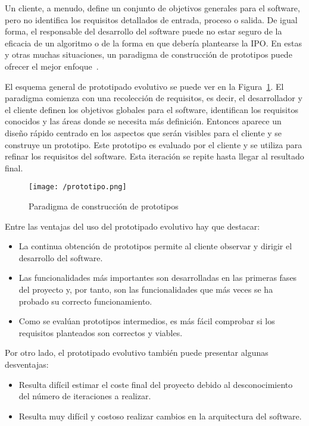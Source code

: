 Un cliente, a menudo, define un conjunto de objetivos generales para el software, pero no identifica
los requisitos detallados de entrada, proceso o salida. De igual forma, el responsable del
desarrollo del software puede no estar seguro de la eficacia de un algoritmo o de la forma en que
debería plantearse la \acs{IPO}. En estas y otras muchas situaciones, un paradigma de construcción
de prototipos puede ofrecer el mejor enfoque~\cite{Pressman10}.

El esquema general de prototipado evolutivo se puede ver en la Figura~\ref{fig:prototipo}. El
paradigma comienza con una recolección de requisitos, es decir, el desarrollador y el cliente
definen los objetivos globales para el software, identifican los requisitos conocidos y las áreas
donde se necesita más definición. Entonces aparece un diseño rápido centrado en los aspectos que
serán visibles para el cliente y se construye un prototipo. Este prototipo es evaluado por el
cliente y se utiliza para refinar los requisitos del software. Esta iteración se repite hasta llegar
al resultado final.

\begin{figure}[!h]
  \begin{center}
    \texttt{[image: /prototipo.png]}
    \caption{Paradigma de construcción de prototipos}
    \label{fig:prototipo}
  \end{center}
\end{figure}

Entre las ventajas del uso del prototipado evolutivo hay que destacar:

\begin{itemize}
  \item La continua obtención de prototipos permite al cliente observar y dirigir el desarrollo del
    software.
  \item Las funcionalidades más importantes son desarrolladas en las primeras fases del proyecto y,
    por tanto, son las funcionalidades que más veces se ha probado su correcto funcionamiento.
  \item Como se evalúan prototipos intermedios, es más fácil comprobar si los requisitos planteados
    son correctos y viables.
\end{itemize}

Por otro lado, el prototipado evolutivo  también puede presentar algunas desventajas:

\begin{itemize}
  \item Resulta difícil estimar el coste final del proyecto debido al desconocimiento del número de
    iteraciones a realizar.
  \item Resulta muy difícil y costoso realizar cambios en la arquitectura del software.
\end{itemize}

